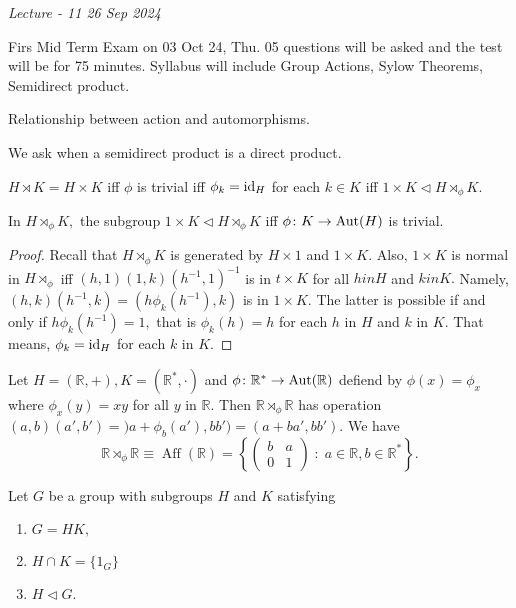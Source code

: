 \noindent\emph{Lecture - 11 \hfill 26 Sep 2024}

Firs Mid Term Exam on 03 Oct 24, Thu.
05 questions will be asked and the test will be for 75 minutes.
Syllabus will include Group Actions, Sylow Theorems, Semidirect product.

Relationship between action and automorphisms.


We ask when a semidirect product is a direct product.

$H \rtimes K = H \times K$ iff
$ \phi $ is trivial iff $ \phi_k = \operatorname{id}_H$ for each $k \in K$
iff $1 \times  K \triangleleft H \rtimes_ \phi K.$


\begin{theorem}
	In $H \rtimes _ \phi K,$ the subgroup $1 \times  K \triangleleft H \rtimes _ \phi K$
	iff $ \phi \colon K \to \operatorname{Aut}(H)$ is trivial.	
\end{theorem}

\begin{proof}
	Recall that $ H \rtimes _ \phi K $ is generated by $H \times  1$ and $ 1 \times  K.$
	Also, $ 1 \times  K$ is normal in $H \rtimes_ \phi$ iff $ (h, 1 ) ( 1,k) ( h^{-1}, 1)^{-1}$ is in $ t \times K$ for all $ h in H$ and $ k in K.$ Namely,
	$(h,k)(h^{-1},k) = (h \phi_k(h^{-1}), k) $ is in $ 1 \times  K.$
	The latter is possible if and only if $ h \phi_k(h^{-1}) = 1,$ that is $\phi_k(h) = h$
	for each $ h$ in $H$ and $k$ in $K.$ That means, $\phi_k = \operatorname{id}_H$ for each $k$ in $K.$
\end{proof}

\begin{example}
	Let $ H = (\mathbb{R}, +), K = (\mathbb{R}^\ast, \cdot)$ and $ \phi \colon \mathbb{R}
	^\ast \to \operatorname{Aut}(\mathbb{R})$ defiend by $ \phi(x) = \phi_x$ where $ \phi_x(y) = xy$
	for all $y$ in $\mathbb{R}.$
	Then $\mathbb{R} \rtimes_ \phi \mathbb{R}$ has operation 
	$(a,b)(a',b') = )a + \phi_b(a'), bb') = (a + ba',bb').$
	We have $$\mathbb{R} \rtimes _\phi \mathbb{R} \equiv \operatorname{Aff}(\mathbb{R})
	 = \left\{ 
	 \begin{pmatrix}
	  b & a \\ 0 & 1 \end{pmatrix} \; : \; a \in \mathbb{R}, b \in \mathbb{R}^\ast 
  \right\} .$$
\end{example}

\begin{theorem}
	Let $G$ be a group with subgroups $H$ and $K$ satisfying 
	\begin{enumerate}
		\item $ G = HK, $ 
		\item $ H \cap K = \{ 1_G \} $ 
		\item $ H \triangleleft G .$ 
	\end{enumerate}
\end{theorem}


